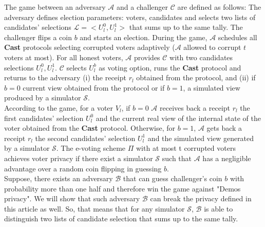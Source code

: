 \documentclass[12pt]{article}
\begin{document}
 The game between an adversary $\mathcal{A}$ and a challenger $\mathcal{C}$ are defined as follows: The adversary defines election parameters: voters, candidates and selects two lists of candidates' selections $\mathcal{L} = <U_l^0, U_l^1>$  that sums up to the same tally. The challenger flips a coin $b$ and starts an election. During the game,   $\mathcal{A}$ schedules all \textbf{Cast} protocols selecting corrupted voters adaptively ($\mathcal{A}$ allowed to corrupt $t$ voters at most). For all honest voters,  $\mathcal{A}$ provides $\mathcal{C}$ with two candidates selections $U_l^0, U_l^1$. $\mathcal{C}$ selects $U_l^b$ as voting option, runs the \textbf{Cast}  protocol and returns to the adversary (i) the receipt $r_l$ obtained from the protocol, and (ii) if $b = 0$ current view obtained from the protocol or if $b =1$, a simulated view produced by a simulator $\mathcal{S}$. \\
 
 According to the game, for a voter $V_l$, if $b = 0$ $\mathcal{A}$ receives back a receipt $r_l$ the first candidates' selection $U_l^0$ and the current real view of the internal state of the voter obtained from the \textbf{Cast} protocol. Otherwise, for $b = 1$,  $\mathcal{A}$ gets back a receipt $r_l$ the second candidates' selection $U_l^1$ and the simulated view generated by a simulator $\mathcal{S}$. The e-voting scheme $\Pi$ with at most t corrupted voters achieves voter privacy if there exist a simulator $\mathcal{S}$ such that $\mathcal{A}$  has a negligible advantage over a random coin flipping in guessing $b$.\\
 
 Suppose, there exists an adversary $\mathcal{B}$ that can guess challenger's coin $b$ with probability more than one half and therefore win the game against "Demos privacy". We will show that such adversary $\mathcal{B}$ can break the privacy defined in this article as well. So, that means that for any simulator $\mathcal{S}$, $\mathcal{B}$ is able to distinguish two lists of candidate selection that sums up to the same tally. \\
 
\end{document}
